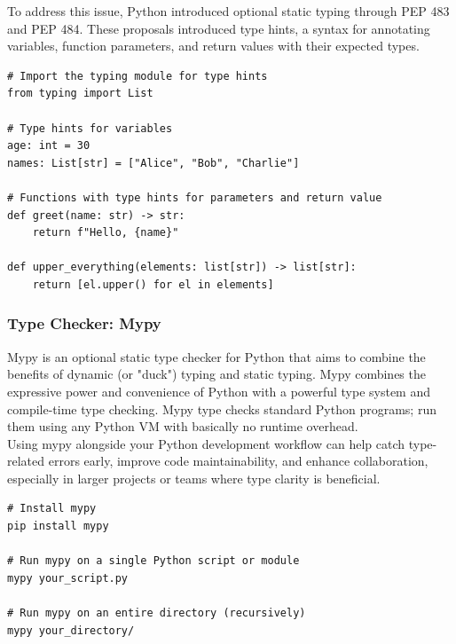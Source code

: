To address this issue, Python introduced optional static typing through PEP 483 and PEP 484. These proposals introduced type hints, a syntax for annotating variables, function parameters, and return values with their expected types. 

\begin{codebox}
\begin{verbatim}
# Import the typing module for type hints
from typing import List

# Type hints for variables
age: int = 30
names: List[str] = ["Alice", "Bob", "Charlie"]

# Functions with type hints for parameters and return value
def greet(name: str) -> str:
    return f"Hello, {name}"

def upper_everything(elements: list[str]) -> list[str]:
    return [el.upper() for el in elements]
\end{verbatim}
\end{codebox}

\subsubsection{Type Checker: Mypy}
Mypy is an optional static type checker for Python that aims to combine the benefits of dynamic (or "duck") typing and static typing. Mypy combines the expressive power and convenience of Python with a powerful type system and compile-time type checking. Mypy type checks standard Python programs; run them using any Python VM with basically no runtime overhead.\\

Using mypy alongside your Python development workflow can help catch type-related errors early, improve code maintainability, and enhance collaboration, especially in larger projects or teams where type clarity is beneficial.

\begin{codebox}
\begin{verbatim}
# Install mypy
pip install mypy

# Run mypy on a single Python script or module
mypy your_script.py

# Run mypy on an entire directory (recursively)
mypy your_directory/
\end{verbatim}
\end{codebox}

